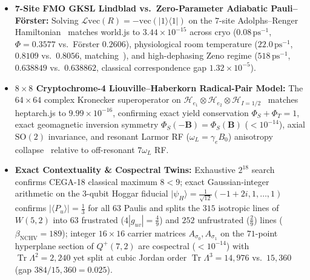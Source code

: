 \documentclass[11pt,a4paper]{article}
\numberwithin{equation}{section}
\theoremstyle{plain}
\theoremstyle{definition}
\theoremstyle{remark}
\newcommand{\code}[1]{{\ttfamily\footnotesize\def\_{\textunderscore\penalty0\hskip0pt}#1}}
\begin{document}
\begin{itemize}[leftmargin=1.6em,itemsep=1pt]
  \item \textbf{7-Site FMO GKSL Lindblad vs.\ Zero-Parameter Adiabatic Pauli--F\"orster:} Solving $\mathcal{L}\mathrm{vec}(R) = -\mathrm{vec}(|1\rangle\langle 1|)$ on the $7$-site Adolphs--Renger Hamiltonian~\cite{AdolphsRenger2006} matches \code{world.js} to $3.44\times 10^{-15}$ across cryo ($0.08\,\mathrm{ps}^{-1}$, $\Phi=0.3577$ vs.\ F\"orster $0.2606$), physiological room temperature ($22.0\,\mathrm{ps}^{-1}$, $0.8109$ vs.\ $0.8056$, matching~\cite{PlenioHuelga2008,WuCaoSilbey2010}), and high-dephasing Zeno regime ($518\,\mathrm{ps}^{-1}$, $0.638849$ vs.\ $0.638862$, classical correspondence gap $1.32\times 10^{-5}$).
  \item \textbf{$8\times 8$ Cryptochrome-4 Liouville--Haberkorn Radical-Pair Model:} The $64\times 64$ complex Kronecker superoperator on $\mathcal{H}_{e_1}\otimes\mathcal{H}_{e_2}\otimes\mathcal{H}_{I=1/2}$~\cite{RitzAdemSchulten2000} matches \code{heptarch.js} to $9.99\times 10^{-16}$, confirming exact yield conservation $\Phi_S + \Phi_T = 1$, exact geomagnetic inversion symmetry $\Phi_S(-\mathbf{B}) = \Phi_S(\mathbf{B})$ ($<10^{-14}$), axial $\mathrm{SO}(2)$ invariance, and resonant Larmor RF ($\omega_L = \gamma_e B_0$) anisotropy collapse~\cite{Ritz2004} relative to off-resonant $7\omega_L$ RF.
  \item \textbf{Exact Contextuality \& Cospectral Twins:} Exhaustive $2^{18}$ search confirms \code{CEGA-18} classical maximum $8 < 9$; exact Gaussian-integer arithmetic on the 3-qubit Hoggar fiducial $|\psi_H\rangle = \frac{1}{\sqrt{12}}(-1+2i, 1, \dots, 1)$ confirms $|\langle P_u\rangle| = \frac{1}{3}$ for all $63$ Paulis and splits the $315$ isotropic lines of $W(5,2)$ into $63$ frustrated ($4|g_{uv}| = \frac{4}{9}$) and $252$ unfrustrated ($\frac{2}{9}$) lines ($\beta_{\mathrm{NCHV}} = 189$); integer $16\times 16$ carrier matrices $A_{\sigma_0}, A_{\sigma_1}$ on the $71$-point hyperplane section of $Q^+(7,2)$ are cospectral ($<10^{-14}$) with $\operatorname{Tr}\Lambda^2 = 2{,}240$ yet split at cubic Jordan order $\operatorname{Tr}\Lambda^3 = 14{,}976$ vs.\ $15{,}360$ (gap $384/15{,}360 = 0.025$).
\end{itemize}
\end{document}
